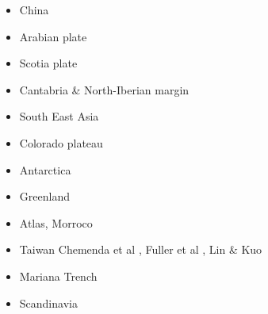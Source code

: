 \begin{itemize}
\item China 
{\scriptsize
\cite{zhst10}
\cite{wazh15}
\cite{guyr16}
\cite{dawl20}
}
\item Arabian plate 
{\scriptsize
\cite{rerl15}
}
\item Scotia plate 
{\scriptsize
\cite{necb13}
}
\item Cantabria \& North-Iberian margin 
{\scriptsize
\cite{clbb02}
\cite{peap15}
}
\item South East Asia 
{\scriptsize
\cite{rekv04}
\cite{yotr15}\cite{hasp15}\cite{meds15}
\cite{necg16}
}
\item Colorado plateau 
{\scriptsize
\cite{vabv10}
\cite{lesm11}
}
\item Antarctica  
{\scriptsize
\cite{huha07}
}
\item Greenland  
{\scriptsize
\cite{stsj15}\cite{heps15}\cite{stbl19}
}
\item Atlas, Morroco  
{\scriptsize
\cite{mica12}
\cite{kava14}
}
\item Taiwan  
{\scriptsize
Chemenda et al \cite{chys01}, Fuller et al \cite{fuwf06}, Lin \& Kuo \cite{liku16}
}
\item Mariana Trench  
{\scriptsize
\cite{zhlb15}
}
\item Scandinavia  
{\scriptsize
\cite{ramb80}
\cite{bovc14}
}



\end{itemize}






